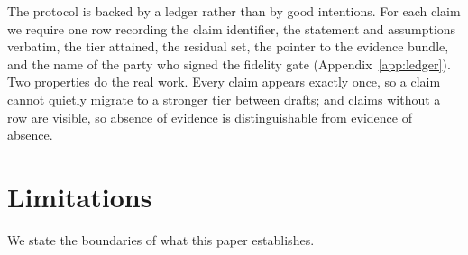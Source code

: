 \documentclass[11pt]{article}
\theoremstyle{plain}
\theoremstyle{definition}
\begin{document}
The protocol is backed by a ledger rather than by good intentions. For each claim we require one
row recording the claim identifier, the statement and assumptions verbatim, the tier attained,
the residual set, the pointer to the evidence bundle, and the name of the party who signed the
fidelity gate (Appendix~\ref{app:ledger}). Two properties do the real work. Every claim appears
exactly once, so a claim cannot quietly migrate to a stronger tier between drafts; and
claims without a row are visible, so absence of evidence is distinguishable from evidence of
absence.

\section{Limitations}
\label{sec:limitations}

We state the boundaries of what this paper establishes.
\end{document}
